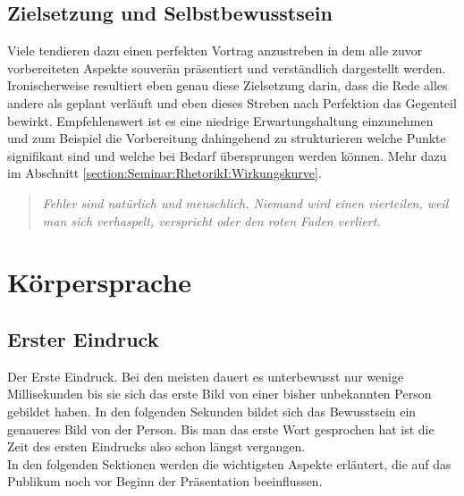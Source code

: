 \documentclass[../main.tex]{subfiles}
\begin{document}
        \subsection[Zielsetzung]{Zielsetzung und Selbstbewusstsein}
            Viele tendieren dazu einen perfekten Vortrag anzustreben in dem alle zuvor vorbereiteten Aspekte souverän präsentiert und verständlich dargestellt werden. Ironischerweise resultiert eben genau diese Zielsetzung darin, dass die Rede alles andere als geplant verläuft und eben dieses Streben nach Perfektion das Gegenteil bewirkt. Empfehlenswert ist es eine niedrige Erwartungshaltung einzunehmen und zum Beispiel die Vorbereitung dahingehend zu strukturieren welche Punkte signifikant sind und welche bei Bedarf übersprungen werden können. Mehr dazu im Abschnitt \ref{section:Seminar:RhetorikI:Wirkungskurve}.
            \begin{quote}
                \emph{Fehler sind natürlich und menschlich. Niemand wird einen vierteilen, weil man sich verhaspelt, verspricht oder den roten Faden verliert.}
            \end{quote}
    
    \section{Körpersprache}
        \subsection{Erster Eindruck}
            Der Erste Eindruck. Bei den meisten dauert es unterbewusst nur wenige Millisekunden bis sie sich das erste Bild von einer bisher unbekannten Person gebildet haben. In den folgenden Sekunden bildet sich das Bewusstsein ein genaueres Bild von der Person. Bis man das erste Wort gesprochen hat ist die Zeit des ersten Eindrucks also schon längst vergangen.\\
            In den folgenden Sektionen werden die wichtigsten Aspekte erläutert, die auf das Publikum noch vor Beginn der Präsentation beeinflussen.
            
\end{document}
